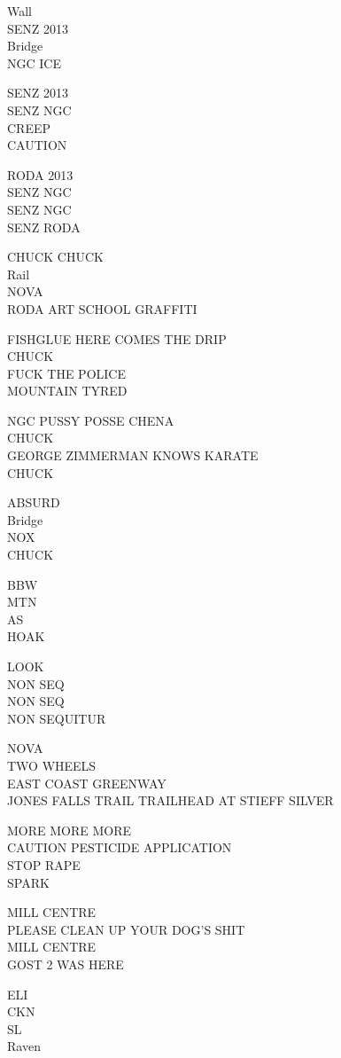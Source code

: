 \documentclass[10pt,letterpaper]{article}
\begin{document}
Wall\\
SENZ 2013\\
Bridge\\
NGC ICE

SENZ 2013\\
SENZ NGC\\
CREEP\\
CAUTION

RODA 2013\\
SENZ NGC\\
SENZ NGC\\
SENZ RODA

CHUCK CHUCK\\
Rail\\
NOVA\\
RODA ART SCHOOL GRAFFITI

FISHGLUE HERE COMES THE DRIP\\
CHUCK\\
FUCK THE POLICE\\
MOUNTAIN TYRED

NGC PUSSY POSSE CHENA\\
CHUCK\\
GEORGE ZIMMERMAN KNOWS KARATE\\
CHUCK

ABSURD\\
Bridge\\
NOX\\
CHUCK

BBW\\
MTN\\
AS\\
HOAK

LOOK\\
NON SEQ\\
NON SEQ\\
NON SEQUITUR

NOVA\\
TWO WHEELS\\
EAST COAST GREENWAY\\
JONES FALLS TRAIL TRAILHEAD AT STIEFF SILVER

MORE MORE MORE\\
CAUTION PESTICIDE APPLICATION\\
STOP RAPE\\
SPARK

MILL CENTRE\\
PLEASE CLEAN UP YOUR DOG'S SHIT\\
MILL CENTRE\\
GOST 2 WAS HERE

ELI\\
CKN\\
SL\\
Raven
\end{document}
